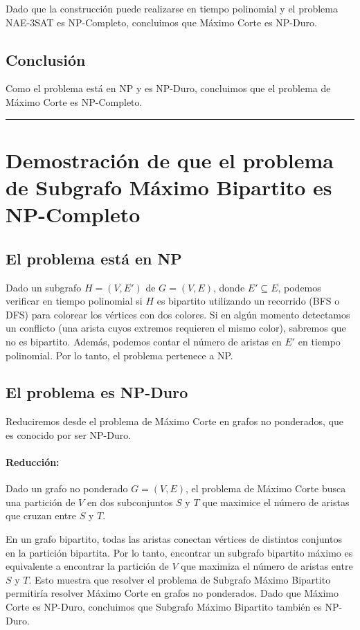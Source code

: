 \documentclass[12pt]{article}
\begin{document}
Dado que la construcción puede realizarse en tiempo polinomial y el problema NAE-3SAT es NP-Completo, concluimos que Máximo Corte es NP-Duro.

\subsection*{Conclusión}

Como el problema está en NP y es NP-Duro, concluimos que el problema de Máximo Corte es NP-Completo.

\bigskip
\hrule
\bigskip

\section*{Demostración de que el problema de Subgrafo Máximo Bipartito es NP-Completo}

\subsection*{El problema está en NP}

Dado un subgrafo $H = (V, E')$ de $G = (V, E)$, donde $E' \subseteq E$, podemos verificar en tiempo polinomial si $H$ es bipartito utilizando un recorrido (BFS o DFS) para colorear los vértices con dos colores. Si en algún momento detectamos un conflicto (una arista cuyos extremos requieren el mismo color), sabremos que no es bipartito. Además, podemos contar el número de aristas en $E'$ en tiempo polinomial. Por lo tanto, el problema pertenece a NP.

\subsection*{El problema es NP-Duro}

Reduciremos desde el problema de Máximo Corte en grafos no ponderados, que es conocido por ser NP-Duro.

\paragraph{Reducción:}
Dado un grafo no ponderado $G = (V, E)$, el problema de Máximo Corte busca una partición de $V$ en dos subconjuntos $S$ y $T$ que maximice el número de aristas que cruzan entre $S$ y $T$.

En un grafo bipartito, todas las aristas conectan vértices de distintos conjuntos en la partición bipartita. Por lo tanto, encontrar un subgrafo bipartito máximo es equivalente a encontrar la partición de $V$ que maximiza el número de aristas entre $S$ y $T$. Esto muestra que resolver el problema de Subgrafo Máximo Bipartito permitiría resolver Máximo Corte en grafos no ponderados. Dado que Máximo Corte es NP-Duro, concluimos que Subgrafo Máximo Bipartito también es NP-Duro.
\end{document}
